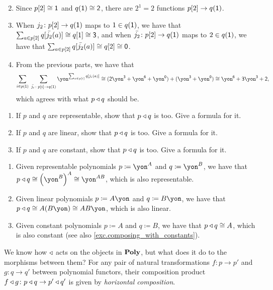\documentclass[Book-Poly]{subfiles}
\begin{document}
\begin{exercise}
\begin{solution}
\begin{enumerate}
\[    \]
    \item Since $p[2] \cong \textsf{1}$ and $q(\textsf{1}) \cong \textsf{2}$, there are $2^1 = 2$ functions $p[2] \to q(\textsf{1})$.
    \item When $j_2 \colon p[2] \to q(\textsf{1})$ maps to $1 \in q(\textsf{1})$, we have that $\sum_{a \in p[2]} q[\bar{j_2}(a)] \cong q[1] \cong \textsf{3}$, and when $\bar{j_2} \colon p[2] \to q(\textsf{1})$ maps to $2 \in q(\textsf{1})$, we have that $\sum_{a \in p[2]} q[\bar{j_2}(a)] \cong q[2] \cong \textsf{0}$.
    \item From the previous parts, we have that
    \[
        \sum_{i\in p(\1)}\;\sum_{\bar{j_i}\colon p[i]\to q(\1)}\yon^{\sum_{a\in p[i]}q[j_i(a)]} \iso (\2\yon^\3 + \yon^\6 + \yon^\0) + (\yon^\3 + \yon^\0) \iso \yon^\6 + \3\yon^\3 + \2,
    \]
    which agrees with what $p \mathbin{\triangleleft} q$ should be.
\end{enumerate}
\end{solution}
\end{exercise}

\begin{exercise}\label{exc.composites_of_specials}
\begin{enumerate}
	\item If $p$ and $q$ are representable, show that $p\mathbin{\triangleleft} q$ is too. Give a formula for it.
	\item If $p$ and $q$ are linear, show that $p\mathbin{\triangleleft} q$ is too. Give a formula for it.
	\item If $p$ and $q$ are constant, show that $p\mathbin{\triangleleft} q$ is too. Give a formula for it.
\qedhere
\end{enumerate}
\begin{solution}
\begin{enumerate}
	\item Given representable polynomials $p \coloneqq \yon^A$ and $q \coloneqq \yon^B$, we have that $p \tri q \iso \left(\yon^B\right)^A \iso \yon^{AB}$, which is also representable.
	\item Given linear polynomials $p \coloneqq A\yon$ and $q \coloneqq B\yon$, we have that $p \tri q \iso A(B\yon) \iso AB\yon$, which is also linear.
	\item Given constant polynomials $p \coloneqq A$ and $q \coloneqq B$, we have that $p \mathbin{\triangleleft} q \cong A$, which is also constant (see also \cref{exc.composing_with_constants}).
\end{enumerate}
\end{solution}
\end{exercise}

We know how $\mathbin{\triangleleft}$ acts on the objects in $\mathbf{Poly}$, but what does it do to the morphisms between them?
For any pair of natural transformations $f\colon p\to p'$ and $g\colon q\to q'$ between polynomial functors, their composition product $f\mathbin{\triangleleft} g\colon p\mathbin{\triangleleft} q\to p'\mathbin{\triangleleft} q'$ is given by \emph{horizontal composition}.
\end{document}
